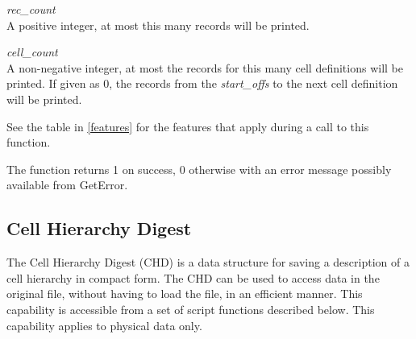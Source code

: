 \begin{description}
\begin{description}
\item{\it rec\_count}\\
A positive integer, at most this many records will be printed.

\item{\it cell\_count}\\
A non-negative integer, at most the records for this many cell
definitions will be printed.  If given as 0, the records from the {\it
start\_offs} to the next cell definition will be printed.
\end{description}

See the table in \ref{features} for the features that apply during a
call to this function.

The function returns 1 on success, 0 otherwise with an error message
possibly available from {\vt GetError}.

\end{description}


\subsection{Cell Hierarchy Digest}

The Cell Hierarchy Digest (CHD) is a data structure for saving a
description of a cell hierarchy in compact form.  The CHD can be used
to access data in the original file, without having to load the file,
in an efficient manner.  This capability is accessible from a set of
script functions described below.  This capability applies to physical
data only.

